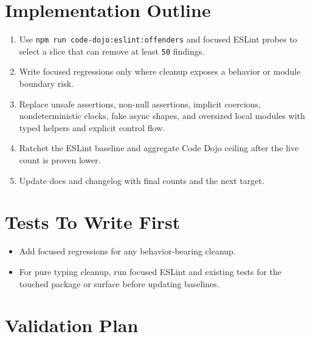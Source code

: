 \section{Implementation Outline}\label{record-238-implementation-outline}

\begin{enumerate}
\def\labelenumi{\arabic{enumi}.}
\tightlist
\item
  Use \texttt{n\allowbreak{}p\allowbreak{}m\allowbreak{} \allowbreak{}r\allowbreak{}u\allowbreak{}n\allowbreak{} \allowbreak{}c\allowbreak{}o\allowbreak{}d\allowbreak{}e\allowbreak{}-\allowbreak{}d\allowbreak{}o\allowbreak{}j\allowbreak{}o\allowbreak{}:\allowbreak{}e\allowbreak{}s\allowbreak{}l\allowbreak{}i\allowbreak{}n\allowbreak{}t\allowbreak{}:\allowbreak{}o\allowbreak{}f\allowbreak{}f\allowbreak{}e\allowbreak{}n\allowbreak{}d\allowbreak{}e\allowbreak{}r\allowbreak{}s} and focused ESLint probes to select a slice that can remove at least \texttt{5\allowbreak{}0} findings.
\item
  Write focused regressions only where cleanup exposes a behavior or module boundary risk.
\item
  Replace unsafe assertions, non-null assertions, implicit coercions, nondeterministic clocks, fake async shapes, and oversized local modules with typed helpers and explicit control flow.
\item
  Ratchet the ESLint baseline and aggregate Code Dojo ceiling after the live count is proven lower.
\item
  Update docs and changelog with final counts and the next target.
\end{enumerate}

\section{Tests To Write First}\label{record-238-tests-to-write-first}

\begin{itemize}
\tightlist
\item
  Add focused regressions for any behavior-bearing cleanup.
\item
  For pure typing cleanup, run focused ESLint and existing tests for the touched package or surface before updating baselines.
\end{itemize}

\section{Validation Plan}\label{record-238-validation-plan}

